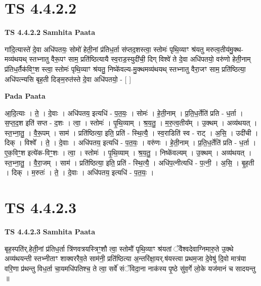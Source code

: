 \documentclass[17pt]{extarticle}
\begin{document}

\section{ TS 4.4.2.2 }

\textbf{TS 4.4.2.2 } \newline
\textbf{Samhita Paata} \newline

गा॑दि॒त्यास्ते॑ दे॒वा अधि॑पतयः॒ सोमो॑ हेती॒नां प्र॑तिध॒र्ता स॑प्तद॒शस्त्वा॒ स्तोमः॑ पृथि॒व्याꣳ श्र॑यतु मरुत्व॒तीय॑मु॒क्थ-मव्य॑थयथ् स्तभ्नातु वैरू॒पꣳ साम॒ प्रति॑ष्ठित्यायै स्व॒राड॒स्युदी॑ची॒ दिग् विश्वे॑ ते दे॒वा अधि॑पतयो॒ वरु॑णो हेती॒नाम् प्र॑तिध॒र्तैक॑विꣳ॒॒श स्त्वा॒ स्तोमः॑ पृथि॒व्याꣳ श्र॑यतु॒ निष्के॑वल्य-मु॒क्थमव्य॑थयथ् स्तभ्नातु वैरा॒जꣳ साम॒ प्रति॑ष्ठित्या॒ अधि॑पत्न्यसि बृह॒ती दिङ्म॒रुत॑स्ते दे॒वा अधि॑पतयो॒ - [  ] \newline

\textbf{Pada Paata} \newline

आ॒दि॒त्याः । ते॒ । दे॒वाः । अधि॑पतय॒ इत्यधि॑ - प॒त॒यः॒ । सोमः॑ । हे॒ती॒नाम् । प्र॒ति॒ध॒र्तेति॑ प्रति - ध॒र्ता । स॒प्त॒द॒श इति॑ सप्त - द॒शः । त्वा॒ । स्तोमः॑ । पृ॒थि॒व्याम् । श्र॒य॒तु॒ । म॒रु॒त्व॒तीय᳚म् । उ॒क्थम् । अव्य॑थयत् । स्त॒भ्ना॒तु॒ । वै॒रू॒पम् । साम॑ । प्रति॑ष्ठित्या॒ इति॒ प्रति॑ - स्थि॒त्यै॒ । स्व॒राडिति॑ स्व - राट् । अ॒सि॒ । उदी॑ची । दिक् । विश्वे᳚ । ते॒ । दे॒वाः । अधि॑पतय॒ इत्यधि॑ - प॒त॒यः॒ । वरु॑णः । हे॒ती॒नाम् । प्र॒ति॒ध॒र्तेति॑ प्रति - ध॒र्ता । ए॒क॒विꣳ॒॒श इत्ये॑क-विꣳ॒॒शः । त्वा॒ । स्तोमः॑ । पृ॒थि॒व्याम् । श्र॒य॒तु॒ । निष्के॑वल्यम् । उ॒क्थम् । अव्य॑थयत् । स्त॒भ्ना॒तु॒ । वै॒रा॒जम् । साम॑ । प्रति॑ष्ठित्या॒ इति॒ प्रति॑ - स्थि॒त्यै॒ । अधि॑प॒त्नीत्यधि॑ - प॒त्नी॒ । अ॒सि॒ । बृ॒ह॒ती । दिक् । म॒रुतः॑ । ते॒ । दे॒वाः । अधि॑पतय॒ इत्यधि॑ - प॒त॒यः॒ ।  \newline





\section{ TS 4.4.2.3 }

\textbf{TS 4.4.2.3 } \newline
\textbf{Samhita Paata} \newline

बृह॒स्पति॑र्.हेती॒नां प्र॑तिध॒र्ता त्रि॑णवत्रयस्त्रिꣳ॒॒शौ त्वा॒ स्तोमौ॑ पृथि॒व्याꣳ श्र॑यतां ॅवैश्वदेवाग्निमारु॒ते उ॒क्थे अव्य॑थयन्ती स्तभ्नीताꣳ शाक्वररैव॒ते साम॑नी॒ प्रति॑ष्ठित्या अ॒न्तरि॑क्षा॒यर्.ष॑यस्त्वा प्रथम॒जा दे॒वेषु॑ दि॒वो मात्र॑या वरि॒णा प्र॑थन्तु विध॒र्ता चा॒यमधि॑पतिश्च॒ ते त्वा॒ सर्वे॑ संॅविदा॒ना नाक॑स्य पृ॒ष्ठे सु॑व॒र्गे लो॒के यज॑मानं च सादयन्तु ॥ \newline
\end{document}

